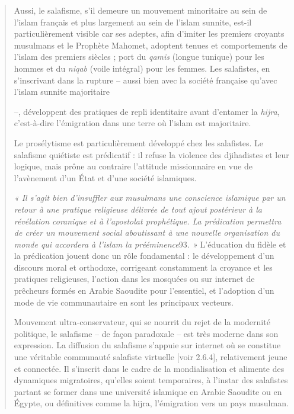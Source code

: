 \begin{quote}
Aussi, le salafisme, s'il demeure un mouvement minoritaire au sein de
l'islam français et plus largement au sein de l'islam sunnite, est-il
particulièrement visible car ses adeptes, afin d'imiter les premiers
croyants musulmans et le Prophète Mahomet, adoptent tenues et
comportements de l'islam des premiers siècles ; port du \emph{qamis}
(longue tunique) pour les hommes et du \emph{niqab} (voile intégral)
pour les femmes. Les salafistes, en s'inscrivant dans la rupture --
aussi bien avec la société française qu'avec l'islam sunnite majoritaire



--, développent des pratiques de repli identitaire avant d'entamer la
\emph{hijra}, c'est-à-dire l'émigration dans une terre où l'islam est
majoritaire.

Le prosélytisme est particulièrement développé chez les salafistes. Le
salafisme quiétiste est prédicatif : il refuse la violence des
djihadistes et leur logique, mais prône au contraire l'attitude
missionnaire en vue de l'avènement d'un État et d'une société
islamiques.

\emph{« Il s'agit bien d'insuffler aux musulmans une conscience
islamique par un retour à une pratique religieuse délivrée de tout ajout
postérieur à la révélation coranique et à l'apostolat prophétique. La
prédication permettra de créer un mouvement social aboutissant à une
nouvelle organisation du monde qui accordera à l'islam la
prééminence}93\emph{. »} L'éducation du fidèle et la prédication jouent
donc un rôle fondamental : le développement d'un discours moral et
orthodoxe, corrigeant constamment la croyance et les pratiques
religieuses, l'action dans les mosquées ou sur internet de prêcheurs
formés en Arabie Saoudite pour l'essentiel, et l'adoption d'un mode de
vie communautaire en sont les principaux vecteurs.

Mouvement ultra-conservateur, qui se nourrit du rejet de la modernité
politique, le salafisme -- de façon paradoxale -- est très moderne dans
son expression. La diffusion du salafisme s'appuie sur internet où se
constitue une véritable communauté salafiste virtuelle {[}voir 2.6.4{]},
relativement jeune et connectée. Il s'inscrit dans le cadre de la
mondialisation et alimente des dynamiques migratoires, qu'elles soient
temporaires, à l'instar des salafistes partant se former dans une
université islamique en Arabie Saoudite ou en Égypte, ou définitives
comme la hijra, l'émigration vers un pays musulman.
\end{quote}


